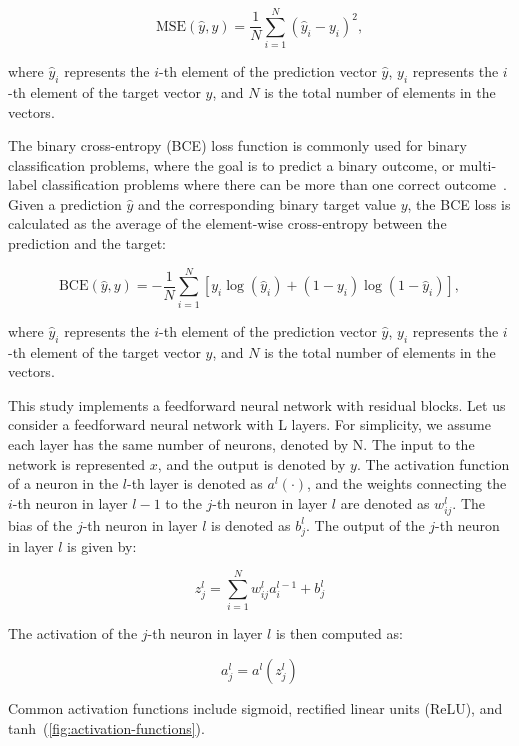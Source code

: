 \documentclass[ppgc,diss,english]{iiufrgs}
\begin{document}
$$\text{MSE}(\hat{y}, y) = \frac{1}{N} \sum_{i=1}^{N} (\hat{y}_i - y_i)^2,$$

where $\hat{y}_i$ represents the $i$-th element of the prediction vector $\hat{y}$, $y_i$ represents the $i$-th element of the target vector $y$, and $N$ is the total number of elements in the vectors.

The binary cross-entropy (BCE) loss function is commonly used for binary classification problems, where the goal is to predict a binary outcome, or multi-label classification problems where there can be more than one correct outcome~\cite{Tsoumakas.etal/2007}.
Given a prediction $\hat{y}$ and the corresponding binary target value $y$, the BCE loss is calculated as the average of the element-wise cross-entropy between the prediction and the target:

$$\text{BCE}(\hat{y}, y) = -\frac{1}{N} \sum_{i=1}^{N} \left[y_i \log(\hat{y}_i) + (1 - y_i) \log(1 - \hat{y}_i)\right],$$

where $\hat{y}_i$ represents the $i$-th element of the prediction vector $\hat{y}$, $y_i$ represents the $i$-th element of the target vector $y$, and $N$ is the total number of elements in the vectors.

This study implements a feedforward neural network with residual blocks. Let us consider a feedforward neural network with L layers. For simplicity, we assume each layer has the same number of neurons, denoted by N. The input to the network is represented $x$, and the output is denoted by $y$. The activation function of a neuron in the $l$-th layer is denoted as $a^l(\cdot)$, and the weights connecting the $i$-th neuron in layer $l-1$ to the $j$-th neuron in layer $l$ are denoted as $w^{l}_{ij}$. The bias of the $j$-th neuron in layer $l$ is denoted as $b^{l}_{j}$. The output of the $j$-th neuron in layer $l$ is given by:

$$z^{l}_{j} = \sum_{i=1}^{N} w^{l}_{ij} a^{l-1}_{i} + b^{l}_{j}$$

The activation of the $j$-th neuron in layer $l$ is then computed as:

$$a^{l}_{j} = a^{l}(z^{l}_{j})$$

Common activation functions include sigmoid, rectified linear units (ReLU), and tanh~(\cref{fig:activation-functions}).
\end{document}
